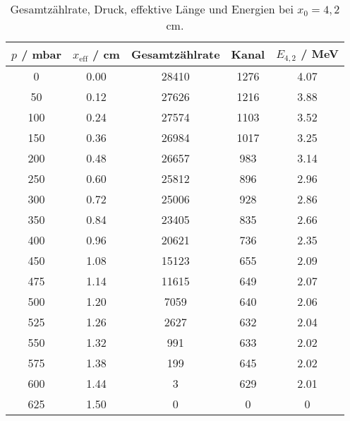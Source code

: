 \begin{table}[!htp]
\centering
\caption{Gesamtzählrate, Druck, effektive Länge und Energien bei $x_0 = 4,2$ cm.}
\label{tab:d42cm}
\begin{tabular}{S[table-format=3.0] S[table-format=1.2] S[table-format=5.0] S[table-format=4.0] S[table-format=1.2]}
\toprule
{$p$ / mbar} & {$x_\text{eff}$ / cm} & {Gesamtzählrate} & {Kanal} & {$E_{4,2}$ / MeV} \\
 & 0.00 & 28410 & 1276 & 4.07 \\
 50 & 0.12 & 27626 & 1216 & 3.88 \\
100 & 0.24 & 27574 & 1103 & 3.52 \\
150 & 0.36 & 26984 & 1017 & 3.25 \\
200 & 0.48 & 26657 &  983 & 3.14 \\
250 & 0.60 & 25812 &  896 & 2.96 \\
300 & 0.72 & 25006 &  928 & 2.86 \\
350 & 0.84 & 23405 &  835 & 2.66 \\
400 & 0.96 & 20621 &  736 & 2.35 \\
450 & 1.08 & 15123 &  655 & 2.09 \\
475 & 1.14 & 11615 &  649 & 2.07 \\
500 & 1.20 &  7059 &  640 & 2.06 \\
525 & 1.26 &  2627 &  632 & 2.04 \\
550 & 1.32 &   991 &  633 & 2.02 \\
575 & 1.38 &   199 &  645 & 2.02 \\
600 & 1.44 &     3 &  629 & 2.01 \\
625 & 1.50 &     0 &    0 & 0    \\
\bottomrule
\end{tabular}
\end{table}